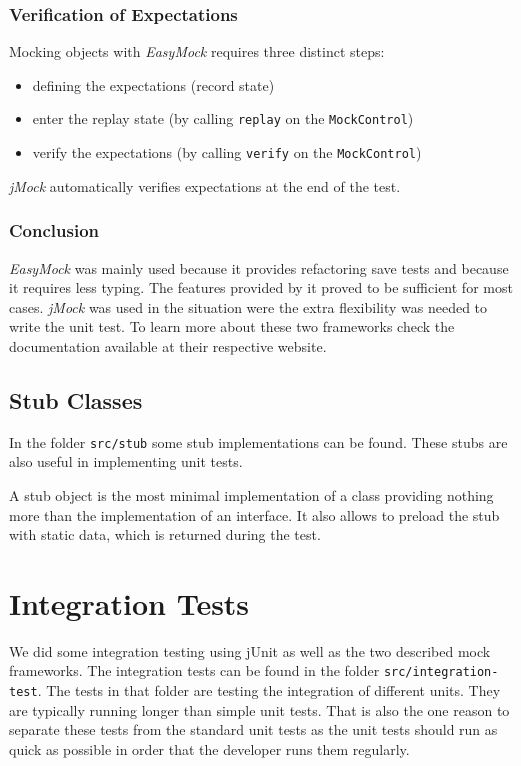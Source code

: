 \subsubsection{Verification of Expectations}
Mocking objects with \emph{EasyMock} requires three distinct steps:

\begin{itemize}
 \item defining the expectations (record state)
 \item enter the replay state (by calling \texttt{replay} on the 
       \texttt{MockControl})
 \item verify the expectations (by calling \texttt{verify} on  the
       \texttt{MockControl})
\end{itemize}

\emph{jMock} automatically verifies expectations at the end of the test. 

\subsubsection{Conclusion}
\emph{EasyMock} was mainly used because it provides refactoring save tests
and because it requires less typing. The
features provided by it proved to be sufficient for most cases. \emph{jMock}
was used in the situation were the extra flexibility was needed to write
the unit test. To learn more about these two frameworks check the documentation
available at their respective website.


\subsection{Stub Classes}
In the folder \texttt{src/stub} some stub implementations can be found. These
stubs are also useful in implementing unit tests.

A stub object is the most minimal implementation of a class providing nothing 
more than the implementation of an interface. It also allows to preload the
stub with static data, which is returned during the test.



\section{Integration Tests}
We did some integration testing using jUnit as well as the two described
mock frameworks. The integration tests can be found in the folder
\texttt{src/integration-test}. The tests in that folder are testing the
integration of different units. They are typically running longer than
simple unit tests. That is also the one reason to separate these tests
from the standard unit tests as the unit tests should run as quick as
possible in order that the developer runs them regularly.



